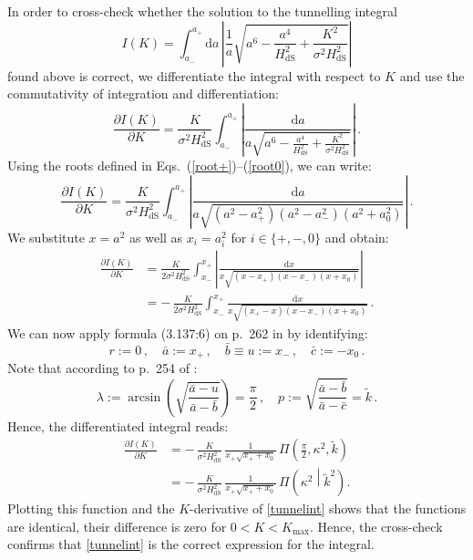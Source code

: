 \documentclass[aps,nofootinbib,prd,superscriptaddress,eqsecnum,showpacs,showkeys,preprintnumbers,altaffilletter]{revtex4}
\def\D{\mathrm{d}}
\def\be{\begin{equation}}
\def\ee{\end{equation}}
\newcommand{\nn}{\nonumber}
\newcommand{\HdS}{H_\mathrm{dS}}
\begin{document}
In order to cross-check whether the solution to the tunnelling integral
\be
I(K) = \int_{a_-}^{a_+}\D a\,\left|\frac{1}{a} \sqrt{a^6  - \frac{a^4}{\HdS^2} + \frac{K^2}{\sigma^2 \HdS^2}}\right|
\ee
found above is correct, we differentiate the integral with respect to $K$ and use the commutativity of integration and differentiation:
\be
\frac{\partial I(K)}{\partial K} = \frac{K}{\sigma^2 \HdS^2}\int_{a_-}^{a_+}\left|\frac{\D a}{a\sqrt{a^6  - \frac{a^4}{\HdS^2} + \frac{K^2}{\sigma^2 \HdS^2}}} \right|\,.
\ee
Using the roots defined in Eqs.~(\ref{root+})--(\ref{root0}), we can write:
\be
\frac{\partial I(K)}{\partial K} = \frac{K}{\sigma^2 \HdS^2}\int_{a_-}^{a_+}\left|\frac{\D a}{a\sqrt{(a^2 - a_+^2)(a^2 - a_-^2)(a^2 + a_0^2)}}\right|\,.
\ee
We substitute $x = a^2$ as well as $x_i = a_i^2$ for $i\in\{+,-,0\}$ and obtain:
\begin{align}
\frac{\partial I(K)}{\partial K} &= \frac{K}{2 \sigma^2 \HdS^2}\int_{x_-}^{x_+}\left|\frac{\D x}{x\sqrt{(x - x_+)(x - x_-)(x + x_0)}}\right|
\nn\\
&= -\,\frac{K}{2 \sigma^2 \HdS^2}\int_{x_-}^{x_+}\frac{\D x}{x\sqrt{(x_+ - x)(x - x_-)(x + x_0)}}\,.
\end{align}
We can now apply formula (3.137:6) on p.~262 in \cite{grad} by identifying:
\be
r:=0\,,\quad \bar{a}:=x_+\,,\quad \bar{b} \equiv u:=x_-\,,\quad \bar{c}:=-x_0\,.
\ee
Note that according to p.~254 of \cite{grad}:
\be
\lambda 
:= \arcsin\left(\sqrt{\frac{\bar{a}-u}{\bar{a}-\bar{b}}}\right) 
=  \frac{\pi}{2}
\,,
\quad 
p:=\sqrt{\frac{\bar{a}-\bar{b}}{\bar{a}-\bar{c}}}
=\tilde{k}\,.
\ee
Hence, the differentiated integral reads:
\begin{align}
\frac{\partial I(K)}{\partial K} &=
-\,\frac{K}{\sigma^2 \HdS^2}\,\frac{1}{x_+\sqrt{x_+ + x_0}}\,\Pi\left(\frac{\pi}{2},%
\kappa^2,%
\tilde{k}\right)
\nn\\
&=-\,\frac{K}{\sigma^2 \HdS^2}\,\frac{1}{x_+\sqrt{x_+ + x_0}}\,\Pi\left({\kappa^2}\middle|\tilde{k}^2\right).
\end{align}
Plotting this function and the $K$-derivative of \eqref{tunnelint} shows that the functions are identical, their difference is zero for $0 < K < K_\text{max}$. Hence, the cross-check confirms that \eqref{tunnelint} is the correct expression for the integral.



%
%
\end{document}
